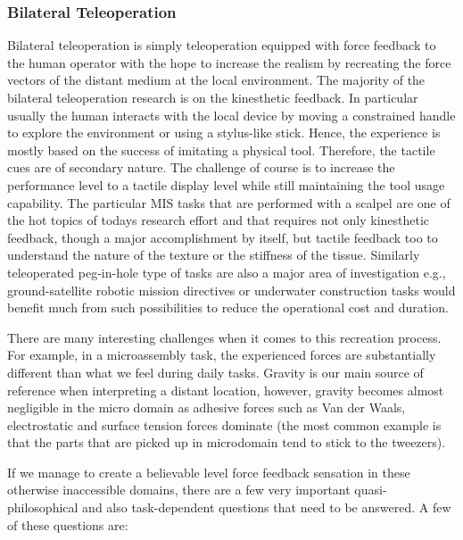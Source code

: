 \subsubsection{Bilateral Teleoperation}

Bilateral teleoperation is simply teleoperation equipped with force feedback to the human operator with the hope to increase the realism by recreating the force vectors of the distant medium at the local environment. The majority of the bilateral teleoperation research is on the kinesthetic feedback. In particular usually the human interacts with the local device by moving a constrained handle to explore the environment or using a stylus-like stick. Hence, the experience is mostly based on the success of imitating a physical tool. Therefore, the tactile cues are of secondary nature. The challenge of course is to increase the performance level to a tactile display level while still maintaining the tool usage capability. The particular MIS tasks that are performed with a scalpel are one of the hot topics of todays research effort and that requires not only kinesthetic feedback, though a major accomplishment by itself, but tactile feedback too to understand the nature of the texture or the stiffness of the tissue. Similarly teleoperated peg-in-hole type of tasks are also a major area of investigation e.g., ground-satellite robotic mission directives or underwater construction tasks would benefit much from such possibilities to reduce the operational cost and duration. 



There are many interesting challenges when it comes to this recreation process. For example, in a microassembly task, the experienced forces are substantially different than what we feel during daily tasks. Gravity is our main source of reference when interpreting a distant location, however, gravity becomes almost negligible in the micro domain as adhesive forces such as Van der Waals, electrostatic and surface tension forces dominate (the most common example is that the parts that are picked up in microdomain tend to stick to the tweezers). 

If we manage to create a believable level force feedback sensation in these otherwise inaccessible domains, there are a few very important quasi-philosophical and also task-dependent questions that need to be answered. A few of these questions are:


